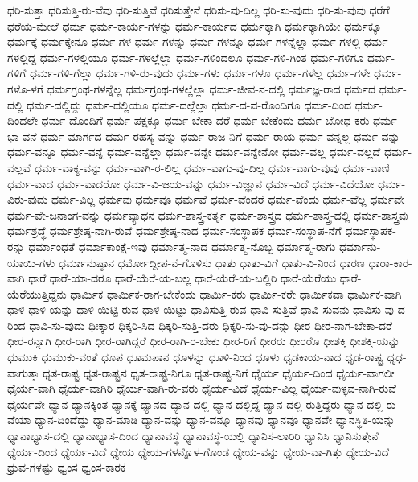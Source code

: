 {ಧರಿ-ಸುತ್ತಾ
ಧರಿಸುತ್ತಿ-ರು-ವೆವು
ಧರಿ-ಸುತ್ತಿವೆ
ಧರಿಸುತ್ತೇನೆ
ಧರಿಸು-ವು-ದಿಲ್ಲ
ಧರಿ-ಸು-ವುದು
ಧರಿ-ಸು-ವುವು
ಧರೆಗೆ
ಧರೆಯ-ಮೇಲೆ
ಧರ್ಮ
ಧರ್ಮ-ಕಾರ್ಯ-ಗಳನ್ನು
ಧರ್ಮ-ಕಾರ್ಯದ
ಧರ್ಮಕ್ಕಾಗಿ
ಧರ್ಮಕ್ಕಾಗಿಯೇ
ಧರ್ಮಕ್ಕೂ
ಧರ್ಮಕ್ಕೆ
ಧರ್ಮಕ್ಕೇನೂ
ಧರ್ಮ-ಗಳ
ಧರ್ಮ-ಗಳನ್ನು
ಧರ್ಮ-ಗಳನ್ನೂ
ಧರ್ಮ-ಗಳನ್ನೆಲ್ಲಾ
ಧರ್ಮ-ಗಳಲ್ಲಿ
ಧರ್ಮ-ಗಳಲ್ಲಿದ್ದ
ಧರ್ಮ-ಗಳಲ್ಲಿಯೂ
ಧರ್ಮ-ಗಳಲ್ಲೆಲ್ಲಾ
ಧರ್ಮ-ಗಳಿಂದಲೂ
ಧರ್ಮ-ಗಳಿ-ಗಿಂತ
ಧರ್ಮ-ಗಳಿಗೂ
ಧರ್ಮ-ಗಳಿಗೆ
ಧರ್ಮ-ಗಳಿ-ಗೆಲ್ಲಾ
ಧರ್ಮ-ಗಳಿ-ರು-ವುದು
ಧರ್ಮ-ಗಳು
ಧರ್ಮ-ಗಳೂ
ಧರ್ಮ-ಗಳೆಲ್ಲ
ಧರ್ಮ-ಗಳೇ
ಧರ್ಮ-ಗಳೊ-ಳಗೆ
ಧರ್ಮಗ್ರಂಥ-ಗಳನ್ನೆಲ್ಲ
ಧರ್ಮಗ್ರಂಥ-ಗಳಲ್ಲೆಲ್ಲಾ
ಧರ್ಮ-ಜೀವ-ನ-ದಲ್ಲಿ
ಧರ್ಮಜ್ಞ-ರಾದ
ಧರ್ಮದ
ಧರ್ಮ-ದಲ್ಲಿ
ಧರ್ಮ-ದಲ್ಲಿದ್ದು
ಧರ್ಮ-ದಲ್ಲಿಯೂ
ಧರ್ಮ-ದಲ್ಲೆಲ್ಲಾ
ಧರ್ಮ-ದ-ವ-ರೊಂದಿಗೂ
ಧರ್ಮ-ದಿಂದ
ಧರ್ಮ-ದಿಂದಲೇ
ಧರ್ಮ-ದೊಂದಿಗೆ
ಧರ್ಮ-ಪಕ್ಷಕ್ಕೂ
ಧರ್ಮ-ಬೇಕಾ-ದರೆ
ಧರ್ಮ-ಬೇಕೆಂದು
ಧರ್ಮ-ಬೋಧ-ಕರು
ಧರ್ಮ-ಭಾ-ವನೆ
ಧರ್ಮ-ಮಾರ್ಗದ
ಧರ್ಮ-ರಹಸ್ಯ-ವನ್ನು
ಧರ್ಮ-ರಾಜ-ನಿಗೆ
ಧರ್ಮ-ರಾಯ
ಧರ್ಮ-ವನ್ನಲ್ಲ
ಧರ್ಮ-ವನ್ನು
ಧರ್ಮ-ವನ್ನೂ
ಧರ್ಮ-ವನ್ನೆ
ಧರ್ಮ-ವನ್ನೆಲ್ಲಾ
ಧರ್ಮ-ವನ್ನೇ
ಧರ್ಮ-ವನ್ನೇನೋ
ಧರ್ಮ-ವಲ್ಲ
ಧರ್ಮ-ವಲ್ಲದೆ
ಧರ್ಮ-ವಲ್ಲವೆ
ಧರ್ಮ-ವಾಕ್ಯ-ವನ್ನು
ಧರ್ಮ-ವಾಗಿ-ರ-ಲಿಲ್ಲ
ಧರ್ಮ-ವಾಗು-ವು-ದಿಲ್ಲ
ಧರ್ಮ-ವಾಗು-ವುವು
ಧರ್ಮ-ವಾಣಿ
ಧರ್ಮ-ವಾದ
ಧರ್ಮ-ವಾದರೋ
ಧರ್ಮ-ವಿ-ಜಯ-ವನ್ನು
ಧರ್ಮ-ವಿಜ್ಞಾನ
ಧರ್ಮ-ವಿದೆ
ಧರ್ಮ-ವಿದೆಯೋ
ಧರ್ಮ-ವಿರು-ವುದು
ಧರ್ಮ-ವಿಲ್ಲ
ಧರ್ಮವು
ಧರ್ಮವೂ
ಧರ್ಮವೆ
ಧರ್ಮ-ವೆಂದರೆ
ಧರ್ಮ-ವೆಂದು
ಧರ್ಮ-ವೆಲ್ಲ
ಧರ್ಮವೇ
ಧರ್ಮ-ವೇ-ಜನಾಂಗ-ವನ್ನು
ಧರ್ಮವ್ಯಾಧನ
ಧರ್ಮ-ಶಾಸ್ತ್ರ-ಕರ್ತೃ
ಧರ್ಮ-ಶಾಸ್ತ್ರದ
ಧರ್ಮ-ಶಾಸ್ತ್ರ-ದಲ್ಲಿ
ಧರ್ಮ-ಶಾಸ್ತ್ರವು
ಧರ್ಮಶ್ರದ್ಧೆ
ಧರ್ಮಶ್ರೇಷ್ಠ-ನಾಗಿ-ರುವೆ
ಧರ್ಮಶ್ರೇಷ್ಠ-ನಾದ
ಧರ್ಮ-ಸಂಸ್ಥಾಪಕ
ಧರ್ಮ-ಸಂಸ್ಥಾಪ-ನೆಗೆ
ಧರ್ಮಸ್ಥಾಪಕ-ರನ್ನು
ಧರ್ಮಾಂಧತೆ
ಧರ್ಮಾಕಾಂಕ್ಷೆ-ಇವು
ಧರ್ಮಾತ್ಮ-ನಾದ
ಧರ್ಮಾತ್ಮ-ನೊಬ್ಬ
ಧರ್ಮಾತ್ಮ-ರಾಗು
ಧರ್ಮಾನು-ಯಾಯಿ-ಗಳು
ಧರ್ಮಾನುಷ್ಠಾನ
ಧರ್ಮೋದ್ದೀಪ-ನೆ-ಗೊಳಿಸು
ಧಾತು
ಧಾತು-ವಿಗೆ
ಧಾತು-ವಿ-ನಿಂದ
ಧಾರಣ
ಧಾರಾ-ಕಾರ-ವಾಗಿ
ಧಾರೆ
ಧಾರೆ-ಯಾ-ದರೂ
ಧಾರೆ-ಯೆರೆ-ಯ-ಬಲ್ಲ
ಧಾರೆ-ಯೆರೆ-ಯ-ಬಲ್ಲಿರಿ
ಧಾರೆ-ಯೆರೆಯು
ಧಾರೆ-ಯೆರೆಯುತ್ತಿದ್ದನು
ಧಾರ್ಮಿಕ
ಧಾರ್ಮಿಕ-ರಾಗ-ಬೇಕೆಂದು
ಧಾರ್ಮಿ-ಕರು
ಧಾರ್ಮಿ-ಕರೇ
ಧಾರ್ಮಿಕವಾ
ಧಾರ್ಮಿಕ-ವಾಗಿ
ಧಾಳಿ
ಧಾಳಿ-ಯನ್ನು
ಧಾಳಿ-ಯಿಟ್ಟಿ-ರುವ
ಧಾಳಿ-ಯಿಟ್ಟು
ಧಾವಿಸುತ್ತಿ-ರುವ
ಧಾವಿ-ಸುತ್ತಿವೆ
ಧಾವಿ-ಸುವನು
ಧಾವಿಸು-ವು-ದ-ರಿಂದ
ಧಾವಿ-ಸು-ವುದು
ಧಿಃಕ್ಕಾರ
ಧಿಕ್ಕರಿ-ಸಿದ
ಧಿಕ್ಕರಿ-ಸುತ್ತಿ-ದರು
ಧಿಕ್ಕರಿ-ಸು-ವು-ದನ್ನು
ಧೀರ
ಧೀರ-ನಾಗ-ಬೇಕಾ-ದರೆ
ಧೀರ-ರನ್ನಾಗಿ
ಧೀರ-ರಾಗಿ
ಧೀರ-ರಾಗಿದ್ದರೆ
ಧೀರ-ರಾಗಿ-ರ-ಬೇಕು
ಧೀರ-ರಿಗೆ
ಧೀರರು
ಧೀರರೊ
ಧೀಶಕ್ತಿ
ಧೀಶಕ್ತಿ-ಯನ್ನು
ಧುಮುಕಿ
ಧುಮುಕು-ವಂತೆ
ಧೂಪ
ಧೂಮಪಾನ
ಧೂಳನ್ನು
ಧೂಳಿ-ನಿಂದ
ಧೂಳು
ಧೃಡಕಾಯ-ನಾದ
ಧೃಡ-ರಾಷ್ಟ್ರ
ಧೃಢ-ವಾಗುತ್ತಾ
ಧೃತ-ರಾಷ್ಟ್ರ
ಧೃತ-ರಾಷ್ಟ್ರನ
ಧೃತ-ರಾಷ್ಟ್ರ-ನಿಗೂ
ಧೃತ-ರಾಷ್ಟ್ರ-ನಿಗೆ
ಧೈರ್ಯ
ಧೈರ್ಯ-ದಿಂದ
ಧೈರ್ಯ-ವಾಗಲೀ
ಧೈರ್ಯ-ವಾಗಿ
ಧೈರ್ಯ-ವಾಗಿರಿ
ಧೈರ್ಯ-ವಾಗಿ-ರು-ವರು
ಧೈರ್ಯ-ವಿದೆ
ಧೈರ್ಯ-ವಿಲ್ಲ
ಧೈರ್ಯ-ವುಳ್ಳವ-ನಾಗಿ-ರುವೆ
ಧೈರ್ಯವೇ
ಧ್ಯಾನ
ಧ್ಯಾನಕ್ಕಿಂತ
ಧ್ಯಾನಕ್ಕೆ
ಧ್ಯಾನದ
ಧ್ಯಾನ-ದಲ್ಲಿ
ಧ್ಯಾನ-ದಲ್ಲಿದ್ದ
ಧ್ಯಾನ-ದಲ್ಲಿ-ರುತ್ತಿದ್ದರು
ಧ್ಯಾನ-ದಲ್ಲಿ-ರು-ವೆಯಾ
ಧ್ಯಾನ-ದಿಂದೆದ್ದು
ಧ್ಯಾನ-ಮಾಡಿ
ಧ್ಯಾನ-ವನ್ನು
ಧ್ಯಾನ-ವನ್ನೂ
ಧ್ಯಾನವು
ಧ್ಯಾನವೂ
ಧ್ಯಾನವೇ
ಧ್ಯಾನಸ್ಥಿತಿ-ಯನ್ನು
ಧ್ಯಾನಾಭ್ಯಾಸ-ದಲ್ಲಿ
ಧ್ಯಾನಾಭ್ಯಾಸ-ದಿಂದ
ಧ್ಯಾನಾವಸ್ಥೆ
ಧ್ಯಾನಾವಸ್ಥೆ-ಯಲ್ಲಿ
ಧ್ಯಾನಿಸ-ಲಾರಿರಿ
ಧ್ಯಾನಿಸಿ
ಧ್ಯಾನಿಸುತ್ತೇನೆ
ಧ್ಯೆರ್ಯ-ದಿಂದ
ಧ್ಯೆರ್ಯ-ವಿದೆ
ಧ್ಯೇಯ
ಧ್ಯೇಯ-ಗಳನ್ನೊಳ-ಗೊಂಡ
ಧ್ಯೇಯ-ವನ್ನು
ಧ್ಯೇಯ-ವಾ-ಗಿತ್ತು
ಧ್ಯೇಯ-ವಿದೆ
ಧ್ರುವ-ಗಳಷ್ಟು
ಧ್ವಂಸ
ಧ್ವಂಸ-ಕಾರಕ
}
